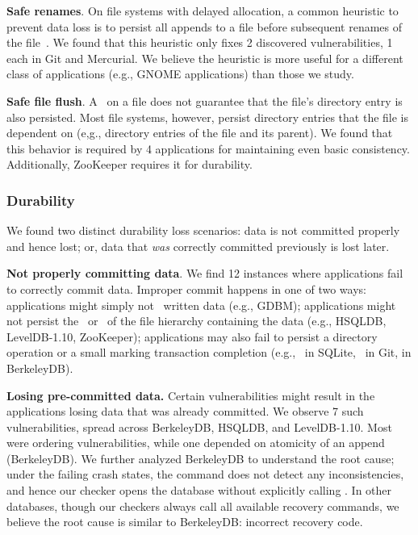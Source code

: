 \textbf{Safe renames}. On file systems with delayed allocation, a common
heuristic to prevent  data loss is to persist all appends to a
file before subsequent renames of the file~\cite{URLmassivefsthread}. We found
that this heuristic only fixes 2 discovered vulnerabilities, 1 each in Git and
Mercurial.  We believe the heuristic is more useful for a different class of
applications (e.g., GNOME applications) than those we study.

\textbf{Safe file flush}. A \fsyncSC\ on a file 
does not guarantee that the file's directory entry is also persisted. Most file systems,
however, persist directory entries that the file is dependent on (e,g.,
directory entries of the file and its parent). We found that this behavior is required
by 4 applications for maintaining even basic consistency. Additionally,
ZooKeeper requires it for durability.

\subsubsection{Durability} 
We found two distinct durability loss scenarios: data is
not committed properly and hence lost; or, data that
\textit{was} correctly committed previously is lost later.

\textbf{Not properly committing data}. We find 12 instances where applications
fail to correctly commit data. Improper commit happens in one of two ways:
applications might simply not \fsyncSC\ written data (e.g., GDBM); applications
might not persist the \creatSC\ or \mkdirSC\ of the file hierarchy containing the
data (e.g., HSQLDB, LevelDB-1.10, ZooKeeper); applications may also fail to
persist a directory operation or a small \writeSC marking transaction completion (e.g.,
\unlinkSC\ in SQLite, \renameSC\ in Git, \writeSC in BerkeleyDB).

\textbf{Losing pre-committed data.} Certain vulnerabilities might result in the
applications losing data that was already committed. We observe 7 such
vulnerabilities, spread across BerkeleyDB, HSQLDB, and LevelDB-1.10. Most were
ordering vulnerabilities, while one depended on atomicity of an append 
(BerkeleyDB). We further analyzed BerkeleyDB to understand the root
cause; under the failing crash states, the  command does not
detect any inconsistencies, and hence our checker opens the database without
explicitly calling . In other databases, though our
checkers always call all available recovery commands, we believe the root cause
is similar to BerkeleyDB: incorrect recovery code.

